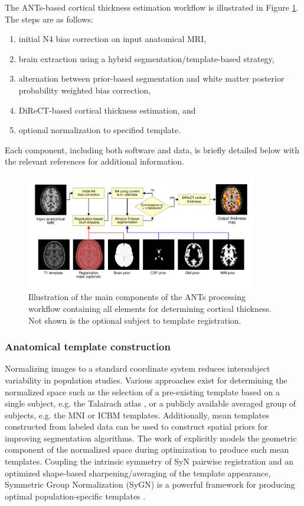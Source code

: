 The ANTs-based cortical thickness estimation workflow is illustrated 
in Figure \ref{fig:pipeline}.  The steps are as follows:
\begin{enumerate}
  \item initial N4 bias correction on input anatomical MRI,
  \item brain extraction using a hybrid segmentation/template-based strategy,
  \item alternation between prior-based segmentation and white matter posterior
        probability weighted bias correction,
  \item DiReCT-based cortical thickness estimation, and
  \item optional normalization to specified template.
\end{enumerate}
Each component, including both software and data, is briefly detailed 
below with the relevant references for additional information. 
\begin{figure}
  \centering
  \includegraphics[width=0.9\textwidth]{figs/Kapowski_pipeline2.pdf}
  \caption{Illustration of the main components of the ANTs processing 
  workflow containing all elements for determining cortical thickness. 
  Not shown is the optional subject to template registration.}
  \label{fig:pipeline}
\end{figure}

\subsubsection{Anatomical template construction}
Normalizing images to a standard coordinate system
reduces intersubject variability in population studies.  Various
approaches exist for determining the normalized space such as the selection
of a pre-existing template based on a single subject, e.g. the Talairach
atlas \citep{Talairach1988}, or a publicly available averaged group of
subjects, e.g. the MNI \citep{Collins1994} or ICBM \citep{Mazziotta1995}
templates.  Additionally, mean templates constructed from labeled
data can be used to construct spatial priors for improving segmentation
algorithms.
The work of \cite{Avants2010} explicitly models the geometric component of the 
normalized space during optimization to produce such mean templates.  Coupling the intrinsic symmetry of 
SyN pairwise registration \citep{Avants2011} and an
optimized shape-based sharpening/averaging of the template appearance, Symmetric Group
Normalization (SyGN) is a powerful framework for producing optimal population-specific
templates \citep{Avants2010}.

